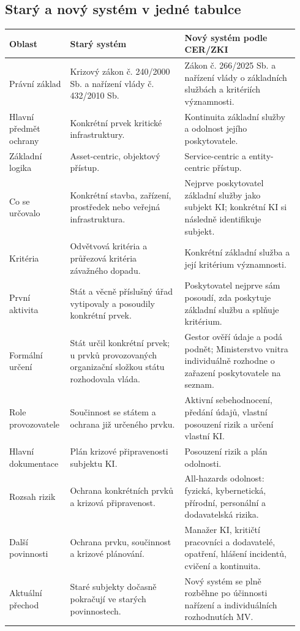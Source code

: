 \documentclass[11pt,a4paper]{article}
\begin{document}
\subsection*{Starý a nový systém v jedné tabulce}
\begin{longtable}{p{0.18\linewidth}p{0.38\linewidth}p{0.38\linewidth}}
\toprule
\textbf{Oblast} & \textbf{Starý systém} & \textbf{Nový systém podle CER/ZKI}\\
\midrule
Právní základ & Krizový zákon č. 240/2000 Sb. a nařízení vlády č. 432/2010 Sb. & Zákon č. 266/2025 Sb. a nařízení vlády o základních službách a kritériích významnosti.\\
Hlavní předmět ochrany & Konkrétní prvek kritické infrastruktury. & Kontinuita základní služby a odolnost jejího poskytovatele.\\
Základní logika & Asset-centric, objektový přístup. & Service-centric a entity-centric přístup.\\
Co se určovalo & Konkrétní stavba, zařízení, prostředek nebo veřejná infrastruktura. & Nejprve poskytovatel základní služby jako subjekt KI; konkrétní KI si následně identifikuje subjekt.\\
Kritéria & Odvětvová kritéria a průřezová kritéria závažného dopadu. & Konkrétní základní služba a její kritérium významnosti.\\
První aktivita & Stát a věcně příslušný úřad vytipovaly a posoudily konkrétní prvek. & Poskytovatel nejprve sám posoudí, zda poskytuje základní službu a splňuje kritérium.\\
Formální určení & Stát určil konkrétní prvek; u prvků provozovaných organizační složkou státu rozhodovala vláda. & Gestor ověří údaje a podá podnět; Ministerstvo vnitra individuálně rozhodne o zařazení poskytovatele na seznam.\\
Role provozovatele & Součinnost se státem a ochrana již určeného prvku. & Aktivní sebehodnocení, předání údajů, vlastní posouzení rizik a určení vlastní KI.\\
Hlavní dokumentace & Plán krizové připravenosti subjektu KI. & Posouzení rizik a plán odolnosti.\\
Rozsah rizik & Ochrana konkrétních prvků a krizová připravenost. & All-hazards odolnost: fyzická, kybernetická, přírodní, personální a dodavatelská rizika.\\
Další povinnosti & Ochrana prvku, součinnost a krizové plánování. & Manažer KI, kritičtí pracovníci a dodavatelé, opatření, hlášení incidentů, cvičení a kontinuita.\\
Aktuální přechod & Staré subjekty dočasně pokračují ve starých povinnostech. & Nový systém se plně rozběhne po účinnosti nařízení a individuálních rozhodnutích MV.\\
\bottomrule
\end{longtable}
\end{document}

